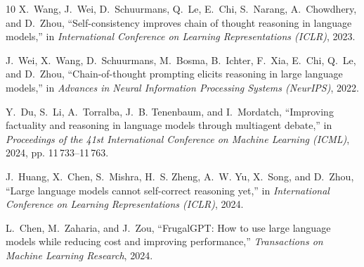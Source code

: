 \documentclass[pdflatex,sn-basic]{sn-jnl}%
\theoremstyle{thmstyletwo}%
\begin{document}
\begin{thebibliography}{10}
X.~Wang, J.~Wei, D.~Schuurmans, Q.~Le, E.~Chi, S.~Narang, A.~Chowdhery, and
  D.~Zhou, ``Self-consistency improves chain of thought reasoning in language
  models,'' in \emph{International Conference on Learning Representations
  (ICLR)}, 2023.

J.~Wei, X.~Wang, D.~Schuurmans, M.~Bosma, B.~Ichter, F.~Xia, E.~Chi, Q.~Le, and
  D.~Zhou, ``Chain-of-thought prompting elicits reasoning in large language
  models,'' in \emph{Advances in Neural Information Processing Systems
  (NeurIPS)}, 2022.

Y.~Du, S.~Li, A.~Torralba, J.~B. Tenenbaum, and I.~Mordatch, ``Improving
  factuality and reasoning in language models through multiagent debate,'' in
  \emph{Proceedings of the 41st International Conference on Machine Learning
  (ICML)}, 2024, pp. 11\,733--11\,763.

J.~Huang, X.~Chen, S.~Mishra, H.~S. Zheng, A.~W. Yu, X.~Song, and D.~Zhou,
  ``Large language models cannot self-correct reasoning yet,'' in
  \emph{International Conference on Learning Representations (ICLR)}, 2024.

L.~Chen, M.~Zaharia, and J.~Zou, ``{FrugalGPT}: How to use large language
  models while reducing cost and improving performance,'' \emph{Transactions on
  Machine Learning Research}, 2024.

\end{thebibliography}
\end{document}

